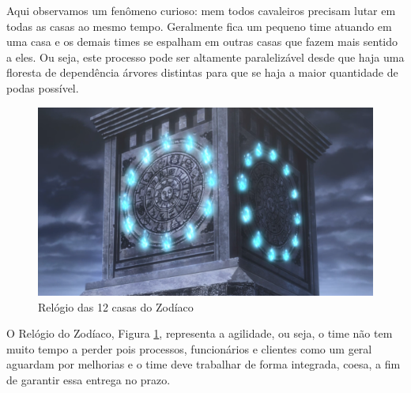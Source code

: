 Aqui observamos um fenômeno curioso: mem todos cavaleiros precisam lutar em todas as casas ao mesmo tempo. Geralmente fica um pequeno time atuando em uma casa e os demais times se espalham em outras casas que fazem mais sentido a eles. Ou seja,  este processo pode ser altamente paralelizável desde que haja uma floresta de dependência árvores distintas para que se haja a maior quantidade de podas possível. 

\begin{figure}[H]
    \centering
    \includegraphics[scale=0.35,keepaspectratio=true]{images/11.png}
    \caption{Relógio das 12 casas do Zodíaco}
    \label{pic_11}
\end{figure}

O Relógio do Zodíaco, Figura \ref{pic_11}, representa a agilidade, ou seja, o time não tem muito tempo a perder pois processos, funcionários e clientes como um geral aguardam  por melhorias e o time deve trabalhar de forma integrada, coesa, a fim de garantir essa entrega no prazo.

